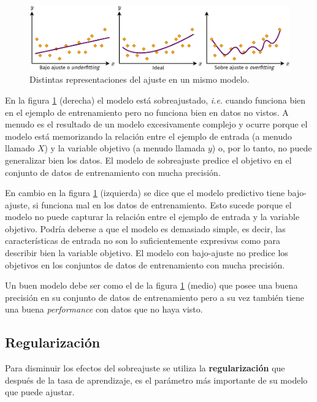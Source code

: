 \documentclass[a4paper,12pt]{article}
\begin{document}
\begin{figure}[H]
	\begin{center}
		\includegraphics[width=1\textwidth]{026.png}
		\caption{Distintas representaciones del ajuste en un mismo modelo.}
		\label{fig:fitting}
	\end{center}
\end{figure}

En la figura \ref{fig:fitting} (derecha) el modelo está sobreajustado, \textit{i.e.} cuando funciona bien en el ejemplo de entrenamiento pero no funciona bien en datos no vistos. A menudo es el resultado de un modelo excesivamente complejo y ocurre porque el modelo está memorizando la relación entre el ejemplo de entrada (a menudo llamado $X$) y la variable objetivo (a menudo llamada $y$) o, por lo tanto, no puede generalizar bien los datos. El modelo de sobreajuste predice el objetivo en el conjunto de datos de entrenamiento con mucha precisión.

En cambio en la figura \ref{fig:fitting} (izquierda) se dice que el modelo predictivo tiene bajo-ajuste, si funciona mal en los datos de entrenamiento. Esto sucede porque el modelo no puede capturar la relación entre el ejemplo de entrada y la variable objetivo. Podría deberse a que el modelo es demasiado simple, es decir, las características de entrada no son lo suficientemente expresivas como para describir bien la variable objetivo. El modelo con bajo-ajuste no predice los objetivos en los conjuntos de datos de entrenamiento con mucha precisión.

Un buen modelo debe ser como el de la figura \ref{fig:fitting} (medio) que posee una buena precisión en su conjunto de datos de entrenamiento pero a su vez también tiene una buena \textit{performance} con datos que no haya visto.

\clearpage

\subsection{Regularización}
Para disminuir los efectos del sobreajuste se utiliza la \textbf{regularización} que después de la tasa de aprendizaje, es el parámetro más importante de su modelo que puede ajustar.
\end{document}
